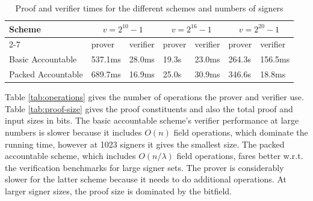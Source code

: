 \begin{table}[h!]
\hfill
\begin{tabular}{| l | l | l | l | l |l | l |}
\hline
 Scheme & \multicolumn{2}{|c|}{$v = 2^{10}-1$} & \multicolumn{2}{|c|}{$v = 2^{16}-1$} & \multicolumn{2}{|c|}{$v = 2^{20}-1$}     \\
\cline{2-7}
 &  prover & verifier & prover & verifier &  prover & verifier \\
\hline


Basic Accountable & 537.1ms & 28.0ms & 19.3s & 23.0ms & 264.3s & 156.5ms \\
Packed Accountable & 689.7ms & 16.9ms & 25.0s & 30.9ms & 346.6s & 18.8ms \\


\hline
\end{tabular}
\caption{Proof and verifier times for the different schemes and numbers of signers}
\label{tab:benchmarks}
\end{table}


\noindent Table \ref{tab:operations} gives the number of operations the prover and verifier use. Table \ref{tab:proof-size} gives the proof constituents and also the total proof and 
input sizes in bits. The basic accountable scheme's verifier performance at large numbers is slower because it includes $O(n)$ field operations, which dominate the running time, 
however at 1023 signers it gives the smallest size. The packed accountable scheme, which includes $O(n/\lambda)$ field operations, fares better w.r.t. the verification benchmarks 
for large signer sets. The prover is considerably slower for the latter scheme because it needs to do additional operations. At larger signer sizes, the proof size is dominated by the bitfield.

